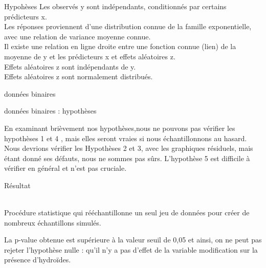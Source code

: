 \documentclass[unknownkeysallowed]{beamer}
\begin{document}
\begin{frame}{Hypohèses}
 Les observés y sont indépendants, conditionnés par certains prédicteurs x.\\
 Les réponses proviennent d'une distribution connue de la famille exponentielle, avec une relation de variance moyenne connue.\\
  Il existe une relation en ligne droite entre une fonction connue (lien) de la moyenne de y et les prédicteurs x et effets aléatoires z.\\
  Effets aléatoires z sont indépendants de y.\\
  Effets aléatoires z sont normalement distribués.\\
\end{frame}
\begin{frame}{données binaires}





\end{frame}


\begin{frame}{données binaires : hypothèses}

En examinant brièvement nos hypothèses,nous ne pouvons pas vérifier les hypothèses 1 et 4 , mais elles seront vraies si nous échantillonnons au hasard. Nous devrions vérifier les Hypothèses 2 et 3,  avec les graphiques résiduels, mais étant donné ses défauts, nous ne sommes pas sûrs. L'hypothèse 5 est difficile à vérifier en général et n'est pas cruciale.


\end{frame}


\begin{frame}{Résultat}
    
 \\
 Procédure statistique qui rééchantillonne un seul jeu de données pour créer de nombreux échantillons simulés. 
    
    
La p-value obtenue est supérieure à la valeur seuil de 0,05 et ainsi, on ne peut pas rejeter l'hypothèse nulle : qu'il n'y a pas d'effet de la variable modification sur la présence d'hydroïdes.
    

\end{frame}
\end{document}
